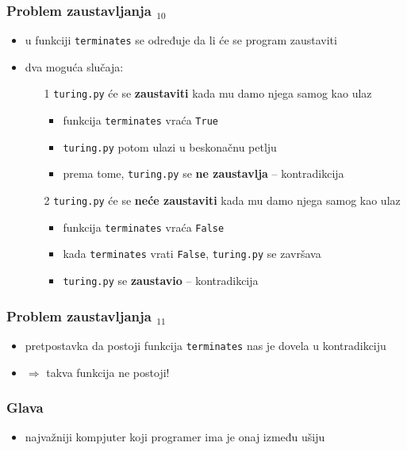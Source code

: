 \documentclass[utf8,compress]{beamer}
\begin{document}
\begin{frame}[fragile]
  \frametitle{Problem zaustavljanja $_{10}$}
  \begin{itemize}
    \item u funkciji \texttt{terminates} se određuje da li će se program zaustaviti
    \item dva moguća slučaja:
  \begin{itemize}
    \item[1] \texttt{turing.py} će se \textbf{zaustaviti} kada mu damo njega samog kao ulaz
  \begin{itemize}
    \item funkcija \texttt{terminates} vraća \texttt{True}
    \item \texttt{turing.py} potom ulazi u beskonačnu petlju
    \item prema tome, \texttt{turing.py} se \textbf{ne zaustavlja} -- kontradikcija
  \end{itemize}
    \item[2] \texttt{turing.py} će se \textbf{neće zaustaviti} kada mu damo njega samog kao ulaz
  \begin{itemize}
    \item funkcija \texttt{terminates} vraća \texttt{False}
    \item kada \texttt{terminates} vrati \texttt{False}, \texttt{turing.py} se završava
    \item \texttt{turing.py} se \textbf{zaustavio} -- kontradikcija
  \end{itemize}
  \end{itemize}
  \end{itemize}
\end{frame}

\begin{frame}[fragile]
  \frametitle{Problem zaustavljanja $_{11}$}
  \begin{itemize}
    \item pretpostavka da postoji funkcija \texttt{terminates} nas je dovela u kontradikciju
    \item $\Rightarrow$ takva funkcija ne postoji!
  \end{itemize}
\end{frame}

\begin{frame}[fragile]
  \frametitle{Glava}
  \begin{itemize}
    \item najvažniji kompjuter koji programer ima je onaj između ušiju
  \end{itemize}
\end{frame}
\end{document}
